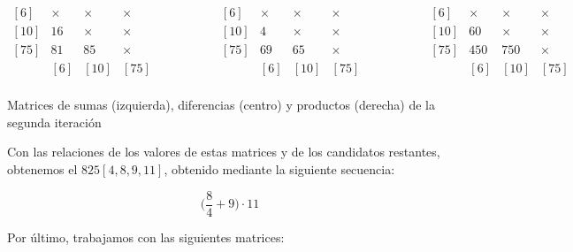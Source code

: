 \begin{center}
$\begin{matrix}
[6]  & \times & \times & \times \\
[10] & 16     & \times & \times \\
[75] & 81     & 85     & \times \\
     &   [6]  &  [10]  &  [75]  \\
\end{matrix}
\ \ \ \ \ \ \ \ \ \ \ \ \ \ \ \ \ \ \ \ \ \ \begin{matrix}
[6]  & \times & \times & \times \\
[10] & 4      & \times & \times \\
[75] & 69     & 65     & \times \\
     &   [6]  &  [10]  &  [75]  \\
\end{matrix}
\ \ \ \ \ \ \ \ \ \ \ \ \ \ \ \ \ \ \ \ \ \ \begin{matrix}
[6]  & \times & \times & \times \\
[10] & 60     & \times & \times \\
[75] & 450    & 750    & \times \\
     &   [6]  &  [10]  &  [75]  \\
\end{matrix}$

Matrices de sumas (izquierda), diferencias (centro) y productos (derecha) de la segunda iteración
\end{center}

Con las relaciones de los valores de estas matrices y de los candidatos restantes, obtenemos el  $825[4,8,9,11]$, obtenido mediante la siguiente secuencia:

\begin{center}
\[\bigg(\frac{8}{4}+9\bigg)\cdot11\]
\end{center}

\pagebreak

Por último, trabajamos con las siguientes matrices:

